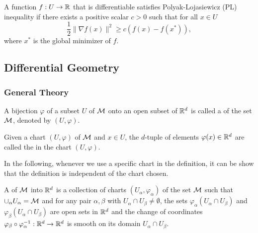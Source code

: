 \documentclass[11pt,a4paper]{article}
\begin{document}
\begin{definition} \label{def:pl_inequality}
A function $f:U\rightarrow \mathbb{R}$ that is differentiable satisfies Polyak-Lojasiewicz (PL) inequality if there exists a positive scalar $c > 0$ such that for all $x\in U$
\begin{equation*}
\dfrac{1}{2}\|\nabla f(x)\|^2 \ge c(f(x) - f(x^*)),
\end{equation*}
where $x^*$ is the global minimizer of $f$.
\end{definition}

\subsection{Differential Geometry} \label{section:diffgeo}

\subsubsection{General Theory}

\begin{definition}
A bijection $\varphi$ of a subset $U$ of $\mathcal{M}$ onto an open subset of $\mathbb{R}^d$ is called a  of the set $\mathcal{M}$, denoted by $(U,\varphi)$.
\end{definition}

Given a chart $(U,\varphi)$ of $\mathcal{M}$ and $x\in U$, the $d$-tuple of elements $\varphi(x)\in \mathbb{R}^d$ are called the  in the chart $(U,\varphi)$.

\begin{remark}
In the following, whenever we use a specific chart in the definition, it can be show that the definition is independent of the chart chosen.
\end{remark}

\begin{definition}
A  of $\mathcal{M}$ into $\mathbb{R}^d$ is a collection of charts $(U_\alpha,\varphi_\alpha)$ of the set $\mathcal{M}$ such that $\cup_\alpha U_\alpha = \mathcal{M}$ and for any pair $\alpha,\beta$ with $U_\alpha\cap U_\beta \neq \emptyset$, the sets $\varphi_\alpha(U_\alpha\cap U_\beta)$ and $\varphi_\beta(U_\alpha\cap U_\beta)$ are open sets in $\mathbb{R}^d$ and the change of coordinates $\varphi_\beta\circ \varphi_\alpha^{-1}:\mathbb{R}^d\rightarrow \mathbb{R}^d$ is smooth on its domain $U_\alpha\cap U_\beta$.
\end{definition}
\end{document}
